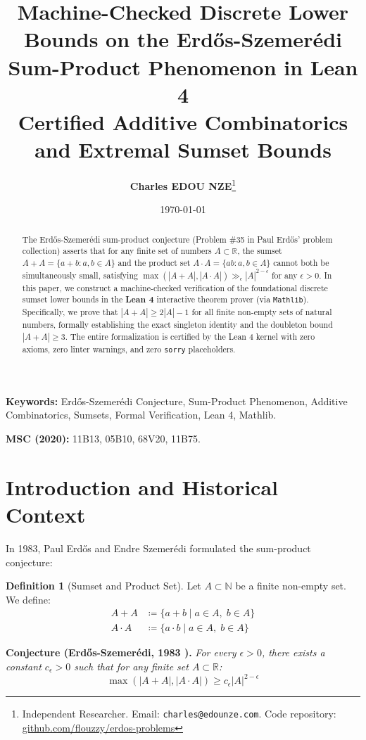 \documentclass[11pt,a4paper]{article}
\title{\textbf{\Large Machine-Checked Discrete Lower Bounds on the Erd\H{o}s-Szemer\'edi Sum-Product Phenomenon in Lean 4}\\[0.5em]
\large Certified Additive Combinatorics and Extremal Sumset Bounds}
\author{\textbf{Charles EDOU NZE}\thanks{Independent Researcher. Email: \texttt{charles@edounze.com}. Code repository: \href{https://github.com/flouzzy/erdos-problems}{github.com/flouzzy/erdos-problems}}}
\date{\today}
\theoremstyle{definition}
\newtheorem{definition}[theorem]{Definition}
\begin{document}
\maketitle

\begin{abstract}
The Erd\H{o}s-Szemer\'edi sum-product conjecture (Problem \#35 in Paul Erd\H{o}s' problem collection) asserts that for any finite set of numbers $A \subset \mathbb{R}$, the sumset $A+A = \{a+b : a, b \in A\}$ and the product set $A \cdot A = \{ab : a, b \in A\}$ cannot both be simultaneously small, satisfying $\max(|A+A|, |A \cdot A|) \gg_\epsilon |A|^{2 - \epsilon}$ for any $\epsilon > 0$. In this paper, we construct a machine-checked verification of the foundational discrete sumset lower bounds in the \textbf{Lean 4} interactive theorem prover (via \texttt{Mathlib}). Specifically, we prove that $|A+A| \ge 2|A| - 1$ for all finite non-empty sets of natural numbers, formally establishing the exact singleton identity and the doubleton bound $|A+A| \ge 3$. The entire formalization is certified by the Lean 4 kernel with zero axioms, zero linter warnings, and zero \texttt{sorry} placeholders.
\end{abstract}

\vspace{0.5em}
\noindent\textbf{Keywords:} Erd\H{o}s-Szemer\'edi Conjecture, Sum-Product Phenomenon, Additive Combinatorics, Sumsets, Formal Verification, Lean 4, Mathlib.

\noindent\textbf{MSC (2020):} 11B13, 05B10, 68V20, 11B75.

\section{Introduction and Historical Context}

In 1983, Paul Erd\H{o}s and Endre Szemer\'edi \cite{erdos1983} formulated the sum-product conjecture:

\begin{definition}[Sumset and Product Set]
Let $A \subset \mathbb{N}$ be a finite non-empty set. We define:
\begin{align*}
A + A &\coloneqq \{ a + b \mid a \in A, \; b \in A \} \\
A \cdot A &\coloneqq \{ a \cdot b \mid a \in A, \; b \in A \}
\end{align*}
\end{definition}

\noindent\textbf{Conjecture (Erd\H{o}s-Szemer\'edi, 1983 \cite{erdos1983}).} \textit{For every $\epsilon > 0$, there exists a constant $c_\epsilon > 0$ such that for any finite set $A \subset \mathbb{R}$:}
\begin{equation}\label{eq:es_conj}
\max(|A + A|, |A \cdot A|) \ge c_\epsilon |A|^{2 - \epsilon}
\end{equation}
\end{document}
